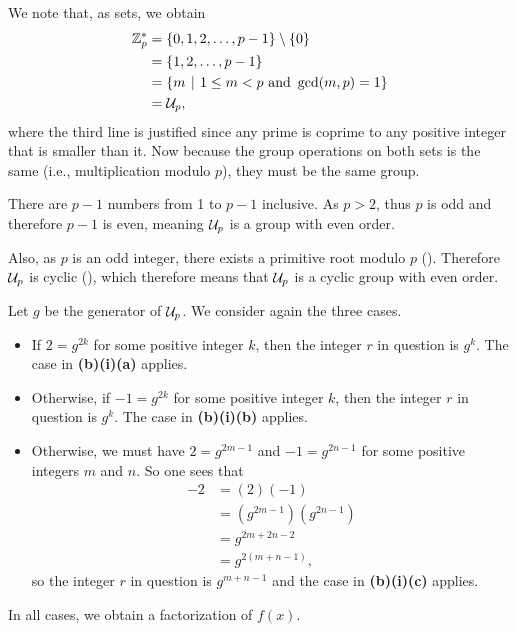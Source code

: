 \begin{questions}
\begin{partquestions}{\alph*}
\begin{partquestions}{\roman*}
            \item We note that, as sets, we obtain
            \begin{align*}
                \Z_p^\ast &= \{0, 1, 2, \dots, p-1\} \setminus \{0\}\\
                &= \{1, 2, \dots, p-1\}\\
                &= \left\{m \vert 1 \leq m < p \text{ and } \gcd(m,p) = 1\right\}\\
                &= \Un{p},
            \end{align*}
            where the third line is justified since any prime is coprime to any positive integer that is smaller than it. Now because the group operations on both sets is the same (i.e., multiplication modulo $p$), they must be the same group.

            \item There are $p - 1$ numbers from 1 to $p - 1$ inclusive. As $p > 2$, thus $p$ is odd and therefore $p - 1$ is even, meaning $\mathcal{U}_{p}$ is a group with even order.

            Also, as $p$ is an odd integer, there exists a primitive root modulo $p$ (). Therefore $\mathcal{U}_{p}$ is cyclic (), which therefore means that $\mathcal{U}_{p}$ is a cyclic group with even order.

            \item Let $g$ be the generator of $\mathcal{U}_{p}$. We consider again the three cases.
            \begin{itemize}
                \item If $2 = g^{2k}$ for some positive integer $k$, then the integer $r$ in question is $g^k$. The case in \textbf{(b)(i)(a)} applies.
                \item Otherwise, if $-1 = g^{2k}$ for some positive integer $k$, then the integer $r$ in question is $g^k$. The case in \textbf{(b)(i)(b)} applies.
                \item Otherwise, we must have $2 = g^{2m - 1}$ and $-1 = g^{2n - 1}$ for some positive integers $m$ and $n$. So one sees that
                \begin{align*}
                    -2 &= (2)(-1)\\
                    &= \left(g^{2m-1}\right)\left(g^{2n-1}\right)\\
                    &= g^{2m+2n-2}\\
                    &= g^{2(m+n-1)},
                \end{align*}
                so the integer $r$ in question is $g^{m+n-1}$ and the case in \textbf{(b)(i)(c)} applies.
            \end{itemize}
            In all cases, we obtain a factorization of $f(x)$.
        \end{partquestions}
    \end{partquestions}
\end{questions}
